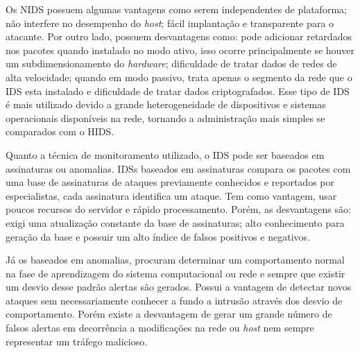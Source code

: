 \documentclass[
	12pt,				
	openright,		
	twoside,	
	a4paper,
	english,	
	brazil	
	]{abntex2}
\begin{document}
 Os NIDS possuem algumas vantagens como serem independentes de plataforma; não interfere no desempenho do \textit{host}; fácil implantação e transparente para o atacante. Por outro lado, possuem desvantagens como: pode adicionar retardados nos pacotes quando instalado no modo ativo, isso ocorre principalmente se houver um subdimensionamento do \textit{hardware}; dificuldade de tratar dados de redes de alta velocidade; quando em modo passivo, trata apenas o segmento da rede que o IDS esta instalado e dificuldade de tratar dados criptografados. Esse tipo de IDS é mais utilizado devido a grande heterogeneidade de dispositivos e sistemas operacionais disponíveis na rede, tornando a administração mais simples se comparados com o HIDS.

 Quanto a técnica de monitoramento utilizado, o IDS pode ser baseados em assinaturas ou anomalias. IDSs baseados em assinaturas compara os pacotes com uma base de assinaturas de ataques previamente conhecidos e reportados por especialistas, cada assinatura identifica um ataque. Tem como vantagem, usar poucos recursos do servidor e rápido processamento. Porém, as desvantagens são: exigi uma atualização constante da base de assinaturas; alto conhecimento para geração da base e possuir um alto índice de falsos positivos e negativos.

 Já os baseados em anomalias, procuram determinar um comportamento normal na fase de aprendizagem do sistema computacional ou rede e sempre que existir um desvio desse padrão alertas são gerados. Possui a vantagem de detectar novos ataques sem necessariamente conhecer a fundo a intrusão através dos desvio de comportamento. Porém existe a desvantagem de gerar um grande número de falsos alertas em decorrência a modificações na rede ou \textit{host} nem sempre representar um tráfego malicioso. 
\end{document}

